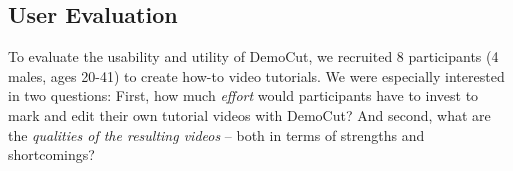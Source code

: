 \subsection{User Evaluation}

To evaluate the usability and utility of DemoCut, we recruited 8 participants (4 males, ages 20-41) to create how-to video tutorials.
We were especially interested in two questions: First, how much {\em effort} would participants have to invest to mark and edit their own tutorial videos with DemoCut? And second, what are the {\em qualities of the resulting videos} -- both in terms of strengths and shortcomings?

